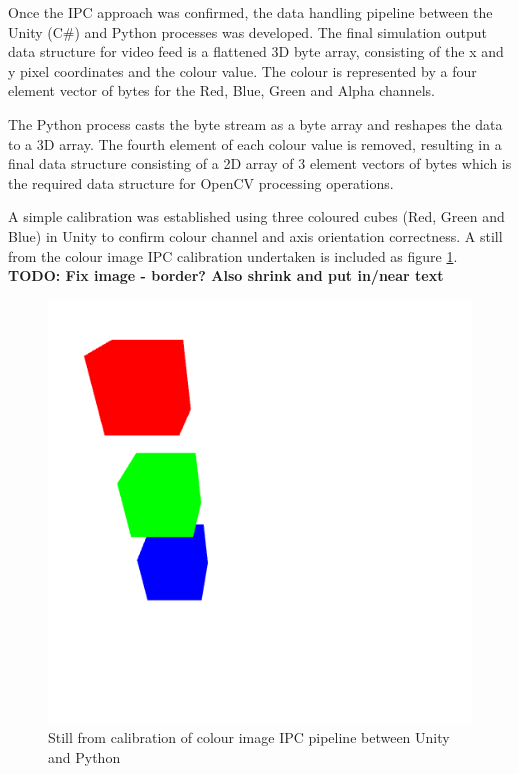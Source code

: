 \documentclass[]{aiaa-tc}%
\begin{document}
Once the IPC approach was confirmed, the data handling pipeline between the Unity (C\#) and Python processes was developed. The final simulation output data structure for video feed is a flattened 3D byte array, consisting of the x and y pixel coordinates and the colour value. The colour is represented by a four element vector of bytes for the Red, Blue, Green and Alpha channels. 

The Python process casts the byte stream as a byte array and reshapes the data to a 3D array. The fourth element of each colour value is removed, resulting in a final data structure consisting of a 2D array of 3 element vectors of bytes which is the required data structure for OpenCV processing operations. 

A simple calibration was established using three coloured cubes (Red, Green and Blue) in Unity to confirm colour channel and axis orientation correctness. A still from the colour image IPC calibration undertaken is included as figure \ref{f:unity_calibration}. \textbf{TODO: Fix image - border? Also shrink and put in/near text}


\begin{figure} %
	\centering
	\includegraphics[width=0.5\linewidth, height=0.5\linewidth]{unity_calibration.png}
	\caption{Still from calibration of colour image IPC pipeline between Unity and Python}
	\label{f:unity_calibration}
\end{figure}
\end{document}
